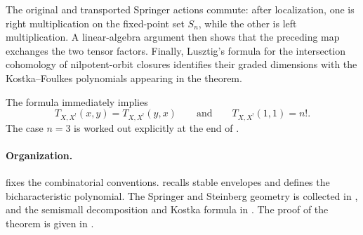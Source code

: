 The original and transported Springer actions commute: after
localization, one is right multiplication on the fixed-point set
$S_n$, while the other is left multiplication. A linear-algebra
argument then shows that the preceding map exchanges the two tensor
factors. Finally, Lusztig's formula for the intersection cohomology of
nilpotent-orbit closures identifies their graded dimensions with the
Kostka--Foulkes polynomials appearing in the theorem.

The formula immediately implies
\[
  T_{X,X^!}(x,y)=T_{X,X^!}(y,x)
  \qquad\text{and}\qquad
  T_{X,X^!}(1,1)=n!.
\]
The case $n=3$ is worked out explicitly at the end of
.

\paragraph{Organization.}
 fixes the combinatorial conventions.
 recalls stable envelopes and defines
the bicharacteristic polynomial. The Springer and Steinberg geometry is
collected in , and the semismall decomposition
and Kostka formula in . The proof of the theorem is
given in .
